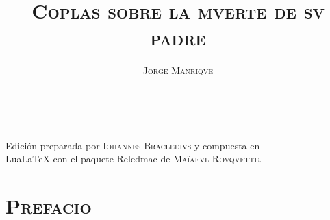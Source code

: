 \documentclass[11pt,a4paper,twoside]{article}
\title{\huge\textsc{Coplas sobre la mverte de sv padre}}
\author{\fontsize{14}{11.96}\selectfont \textsc{Jorge Manriqve}}
\date{\vspace{60pt}\fontsize{12}{11}\selectfont{\textsc{edición crítica liminar}}\\\fontsize{40}{11}\selectfont{\vfill\LaTeX}}
\begin{document}
	{
	\maketitle
}
	\newpage
%
\hskip0pt
\vfill
\begin{flushright}
	Edición preparada por \textsc{Iohannes Bracledivs} y compuesta en\\ LuaLaTeX con el paquete Reledmac de \textsc{Maïaevl Rovqvette}.
\end{flushright}
\newpage
%
\tableofcontents
\newpage
%
\setcounter{page}{1}
\section*{\centering\normalsize \textsc{Prefacio}}
\end{document}
